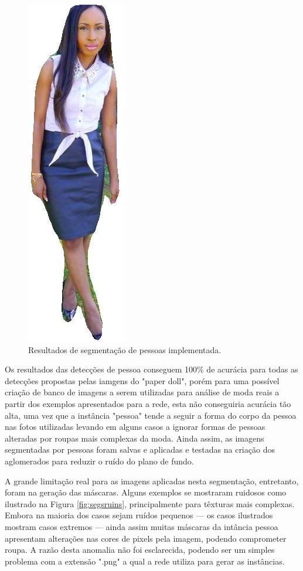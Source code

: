 \documentclass[12pt]{report}
\begin{document}
\begin{figure}
\begin{minipage}[b]{0.3\textwidth}
    \includegraphics[scale=0.5]{images/resultados/1082993mask.jpg}
  \end{minipage}
    \hfill
  \caption{Resultados de segmentação de pessoas implementada.}
  \label{fig:person-seg}
\end{figure}

Os resultados das detecções de pessoa conseguem 100\% de acurácia para todas as detecções propostas pelas iamgens do "paper doll", porém para uma possível criação de banco de imagens a serem utilizadas para análise de moda reais a partir dos exemplos apresentados para a rede, esta não conseguiria acurácia tão alta, uma vez que a instância "pessoa" tende a seguir a forma do corpo da pessoa nas fotos utilizadas levando em alguns casos a ignorar formas de pessoas alteradas por roupas mais complexas da moda. Ainda assim, as imagens segmentadas por pessoas foram salvas e aplicadas e testadas na criação dos aglomerados para reduzir o ruído do plano de fundo. 

A grande limitação real para as imagens aplicadas nesta segmentação, entretanto, foram na geração das máscaras. Alguns exemplos se mostraram ruidosos como ilustrado na Figura \ref{fig:segsruins}, principalmente para têxturas mais complexas. Embora na maioria dos casos sejam ruídos pequenos --- os casos ilustrados mostram casos extremos --- ainda assim muitas máscaras da intância pessoa apresentam alterações nas cores de pixels pela imagem, podendo comprometer roupa. A razão desta anomalia não foi esclarecida, podendo ser um simples problema com a extensão ".png" a qual a rede utiliza para gerar as instâncias.
\end{document}
